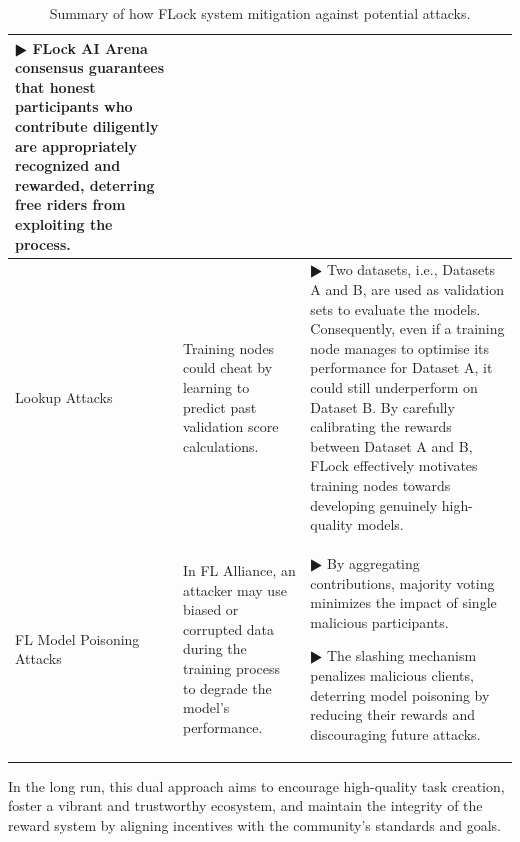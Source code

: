 \documentclass[conference]{IEEEtran}
\begin{document}
\begin{table}[htbp]
{\begin{tabular}{p{2.5cm}|p{6.5cm}|p{9cm}}
{$\RHD$ FLock AI Arena consensus guarantees that
honest participants who contribute diligently are appropriately recognized and rewarded, deterring free riders
from exploiting the process.}\\

\hline

Lookup Attacks& Training nodes could cheat by learning to predict past validation score calculations. & {$\RHD$ Two datasets, i.e., Datasets A and B, are used as validation sets to evaluate the models.  Consequently, even if a training node manages to optimise its performance for Dataset A, it could still underperform on Dataset B. By carefully calibrating the rewards between Dataset A and B, FLock effectively motivates training nodes towards developing genuinely high-quality models.}\\
\hline

FL Model Poisoning Attacks &In FL Alliance, an attacker may use biased or corrupted data during the training process to degrade the model's performance.
& {$\RHD$ 
By aggregating contributions, majority voting minimizes the impact of single malicious participants.

$\RHD$
The slashing mechanism penalizes malicious clients, deterring model poisoning by reducing their rewards and discouraging future attacks.
}\\

\bottomrule

\end{tabular}
}
    \caption{Summary of how FLock system mitigation against potential attacks.}
    \label{tab:security}
\end{table}



In the long run, this dual approach aims to encourage high-quality task creation, foster a vibrant and trustworthy ecosystem, and maintain the integrity of the \FML reward system by aligning incentives with the community’s standards and goals.
\end{document}
